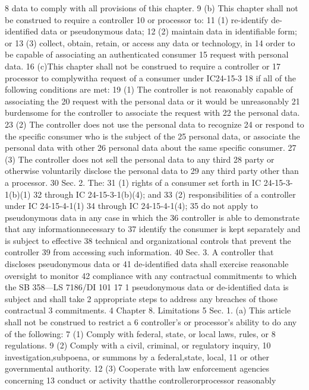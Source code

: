8 data to comply with all provisions of this chapter.
9 (b) This chapter shall not be construed to require a controller
10 or processor to:
11 (1) re-identify de-identified data or pseudonymous data;
12 (2) maintain data in identifiable form; or
13 (3) collect, obtain, retain, or access any data or technology, in
14 order to be capable of associating an authenticated consumer
15 request with personal data.
16 (c)This chapter shall not be construed to require a controller or
17 processor to complywitha request of a consumer under IC24-15-3
18 if all of the following conditions are met:
19 (1) The controller is not reasonably capable of associating the
20 request with the personal data or it would be unreasonably
21 burdensome for the controller to associate the request with
22 the personal data.
23 (2) The controller does not use the personal data to recognize
24 or respond to the specific consumer who is the subject of the
25 personal data, or associate the personal data with other
26 personal data about the same specific consumer.
27 (3) The controller does not sell the personal data to any third
28 party or otherwise voluntarily disclose the personal data to
29 any third party other than a processor.
30 Sec. 2. The:
31 (1) rights of a consumer set forth in IC 24-15-3-1(b)(1)
32 through IC 24-15-3-1(b)(4); and
33 (2) responsibilities of a controller under IC 24-15-4-1(1)
34 through IC 24-15-4-1(4);
35 do not apply to pseudonymous data in any case in which the
36 controller is able to demonstrate that any informationnecessary to
37 identify the consumer is kept separately and is subject to effective
38 technical and organizational controls that prevent the controller
39 from accessing such information.
40 Sec. 3. A controller that discloses pseudonymous data or
41 de-identified data shall exercise reasonable oversight to monitor
42 compliance with any contractual commitments to which the
SB 358—LS 7186/DI 101
17
1 pseudonymous data or de-identified data is subject and shall take
2 appropriate steps to address any breaches of those contractual
3 commitments.
4 Chapter 8. Limitations
5 Sec. 1. (a) This article shall not be construed to restrict a
6 controller's or processor's ability to do any of the following:
7 (1) Comply with federal, state, or local laws, rules, or
8 regulations.
9 (2) Comply with a civil, criminal, or regulatory inquiry,
10 investigation,subpoena, or summons by a federal,state, local,
11 or other governmental authority.
12 (3) Cooperate with law enforcement agencies concerning
13 conduct or activity thatthe controllerorprocessor reasonably
